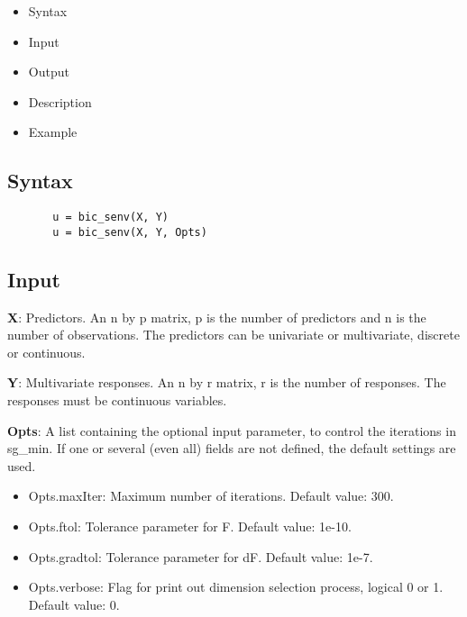 \documentclass[a4paper,11pt,openany]{memoir}
\begin{document}
\begin{itemize}
\setlength{\itemsep}{-1ex}
   \item Syntax
   \item Input
   \item Output
   \item Description
   \item Example
\end{itemize}


\subsection*{Syntax}


\begin{verbatim}       u = bic_senv(X, Y)
       u = bic_senv(X, Y, Opts)\end{verbatim}
    

\subsection*{Input}

\begin{par}
\textbf{X}: Predictors. An n by p matrix, p is the number of predictors and n is the number of observations. The predictors can be univariate or multivariate, discrete or continuous.
\end{par} \vspace{1em}
\begin{par}
\textbf{Y}: Multivariate responses. An n by r matrix, r is the number of responses. The responses must be continuous variables.
\end{par} \vspace{1em}
\begin{par}
\textbf{Opts}: A list containing the optional input parameter, to control the iterations in sg\_min. If one or several (even all) fields are not defined, the default settings are used.
\end{par} \vspace{1em}
\begin{itemize}
\setlength{\itemsep}{-1ex}
   \item Opts.maxIter: Maximum number of iterations.  Default value: 300.
   \item Opts.ftol: Tolerance parameter for F.  Default value: 1e-10.
   \item Opts.gradtol: Tolerance parameter for dF.  Default value: 1e-7.
   \item Opts.verbose: Flag for print out dimension selection process, logical 0 or 1. Default value: 0.
\end{itemize}
\end{document}
